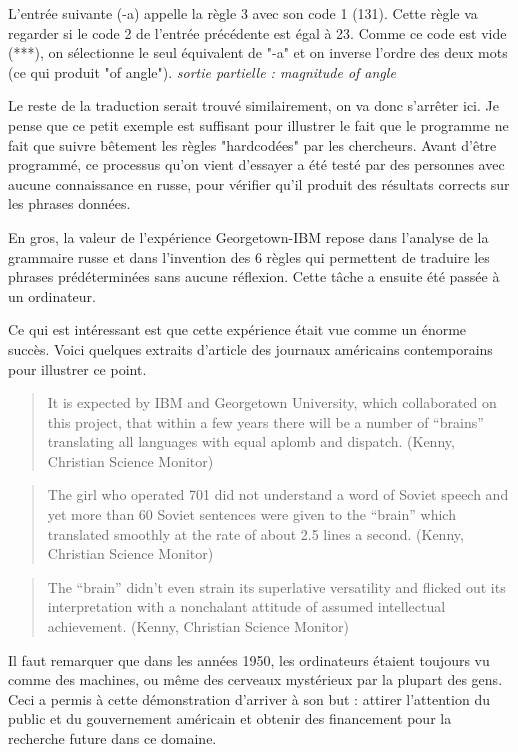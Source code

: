 \documentclass[11pt,a4paper]{report}
\begin{document}
L'entrée suivante (-a) appelle la règle 3 avec son code 1 (131). Cette règle va regarder si le 
code 2 de l'entrée précédente est égal à 23. Comme ce code est vide (***), on sélectionne le seul 
équivalent de "-a" et on inverse l'ordre des deux mots (ce qui produit "of angle"). \newline
\textit{sortie partielle : magnitude of angle}

Le reste de la traduction serait trouvé similairement, on va donc s'arrêter ici. Je pense que ce 
petit exemple est suffisant pour illustrer le fait que le programme ne fait que suivre bêtement les 
règles "hardcodées" par les chercheurs. Avant d'être programmé, ce processus qu'on vient d'essayer 
a été testé par des personnes avec aucune connaissance en russe, pour vérifier qu'il produit des 
résultats corrects sur les phrases données. 

En gros, la valeur de l'expérience Georgetown-IBM repose dans l'analyse de la grammaire russe et dans 
l'invention des 6 règles qui permettent de traduire les phrases prédéterminées sans aucune réflexion. 
Cette tâche a ensuite été passée à un ordinateur. 

Ce qui est intéressant est que cette expérience était vue comme un énorme succès. Voici quelques 
extraits d'article des journaux américains contemporains pour illustrer ce point.
\begin{quote} 
It is expected by IBM and Georgetown University, which collaborated on this project,
that within a few years there will be a number of “brains” translating all languages
with equal aplomb and dispatch. (Kenny, Christian Science Monitor)
\end{quote}

\begin{quote}
The girl who operated 701 did not understand a word of Soviet speech and yet more
than 60 Soviet sentences were given to the “brain” which translated smoothly at the
rate of about 2.5 lines a second. (Kenny, Christian Science Monitor)
\end{quote}

\begin{quote}
The “brain” didn’t even strain its superlative versatility and flicked out its
interpretation with a nonchalant attitude of assumed intellectual achievement. (Kenny,
Christian Science Monitor)
\end{quote}

Il faut remarquer que dans les années 1950, les ordinateurs étaient toujours vu comme des machines, ou 
même des cerveaux mystérieux par la plupart des gens. Ceci a permis à cette démonstration d'arriver à 
son but : attirer l'attention du public et du gouvernement américain et obtenir des financement pour 
la recherche future dans ce domaine. 
  
\end{document}
